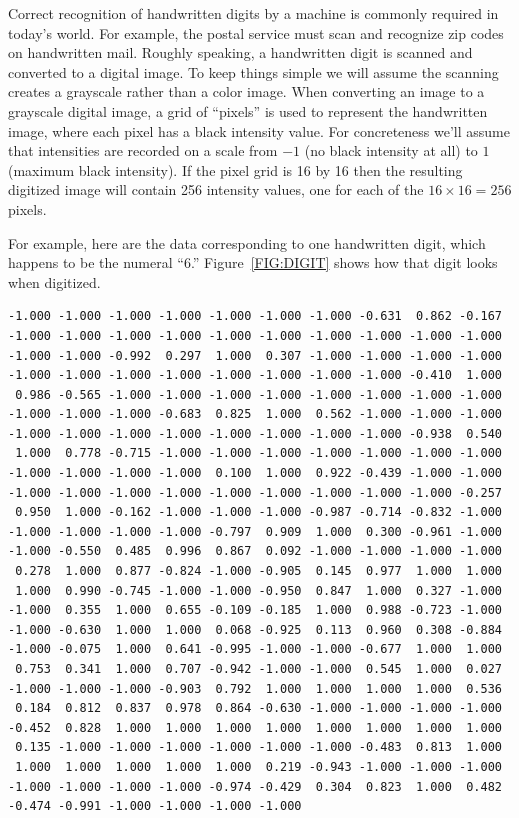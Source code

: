 \documentclass[12pt,oneside]{book}\usepackage[]{graphicx}\usepackage[]{color}
\makeatletter
\newenvironment{kframe}{%
 \def\at@end@of@kframe{}%
 \ifinner\ifhmode%
  \def\at@end@of@kframe{\end{minipage}}%
  \begin{minipage}{\columnwidth}%
 \fi\fi%
 \def\FrameCommand##1{\hskip\@totalleftmargin \hskip-\fboxsep
 \colorbox{shadecolor}{##1}\hskip-\fboxsep
     \hskip-\linewidth \hskip-\@totalleftmargin \hskip\columnwidth}%
 \MakeFramed {\advance\hsize-\width
   \@totalleftmargin\z@ \linewidth\hsize
   \@setminipage}}%
 {\par\unskip\endMakeFramed%
 \at@end@of@kframe}
\newenvironment{knitrout}{}{} %
\makeatother
\begin{document}
Correct recognition of handwritten digits by a machine is commonly required in today's world. For example, the postal service must scan and recognize zip codes on handwritten mail. Roughly speaking, a handwritten digit is scanned and converted to a digital image. To keep things simple we will assume the scanning creates a grayscale rather than a color image. When converting an image to a grayscale digital image, a grid of ``pixels'' is used to represent the handwritten image, where each pixel has a black intensity value. For concreteness we'll assume that intensities are recorded on a scale from $-1$ (no black intensity at all) to $1$ (maximum black intensity). If the pixel grid is 16 by 16 then the resulting digitized image will contain 256 intensity values, one for each of the $16\times 16 = 256$ pixels.

For example, here are the data corresponding to one handwritten digit, which happens to be the numeral ``6.'' Figure~\ref{FIG:DIGIT} shows how that digit looks when digitized.
\begin{knitrout}
\color{fgcolor}\begin{kframe}
\begin{verbatim}
-1.000 -1.000 -1.000 -1.000 -1.000 -1.000 -1.000 -0.631  0.862 -0.167 
-1.000 -1.000 -1.000 -1.000 -1.000 -1.000 -1.000 -1.000 -1.000 -1.000 
-1.000 -1.000 -0.992  0.297  1.000  0.307 -1.000 -1.000 -1.000 -1.000 
-1.000 -1.000 -1.000 -1.000 -1.000 -1.000 -1.000 -1.000 -0.410  1.000 
 0.986 -0.565 -1.000 -1.000 -1.000 -1.000 -1.000 -1.000 -1.000 -1.000 
-1.000 -1.000 -1.000 -0.683  0.825  1.000  0.562 -1.000 -1.000 -1.000 
-1.000 -1.000 -1.000 -1.000 -1.000 -1.000 -1.000 -1.000 -0.938  0.540 
 1.000  0.778 -0.715 -1.000 -1.000 -1.000 -1.000 -1.000 -1.000 -1.000 
-1.000 -1.000 -1.000 -1.000  0.100  1.000  0.922 -0.439 -1.000 -1.000 
-1.000 -1.000 -1.000 -1.000 -1.000 -1.000 -1.000 -1.000 -1.000 -0.257 
 0.950  1.000 -0.162 -1.000 -1.000 -1.000 -0.987 -0.714 -0.832 -1.000 
-1.000 -1.000 -1.000 -1.000 -0.797  0.909  1.000  0.300 -0.961 -1.000 
-1.000 -0.550  0.485  0.996  0.867  0.092 -1.000 -1.000 -1.000 -1.000 
 0.278  1.000  0.877 -0.824 -1.000 -0.905  0.145  0.977  1.000  1.000 
 1.000  0.990 -0.745 -1.000 -1.000 -0.950  0.847  1.000  0.327 -1.000 
-1.000  0.355  1.000  0.655 -0.109 -0.185  1.000  0.988 -0.723 -1.000 
-1.000 -0.630  1.000  1.000  0.068 -0.925  0.113  0.960  0.308 -0.884 
-1.000 -0.075  1.000  0.641 -0.995 -1.000 -1.000 -0.677  1.000  1.000 
 0.753  0.341  1.000  0.707 -0.942 -1.000 -1.000  0.545  1.000  0.027 
-1.000 -1.000 -1.000 -0.903  0.792  1.000  1.000  1.000  1.000  0.536 
 0.184  0.812  0.837  0.978  0.864 -0.630 -1.000 -1.000 -1.000 -1.000 
-0.452  0.828  1.000  1.000  1.000  1.000  1.000  1.000  1.000  1.000 
 0.135 -1.000 -1.000 -1.000 -1.000 -1.000 -1.000 -0.483  0.813  1.000 
 1.000  1.000  1.000  1.000  1.000  0.219 -0.943 -1.000 -1.000 -1.000 
-1.000 -1.000 -1.000 -1.000 -0.974 -0.429  0.304  0.823  1.000  0.482 
-0.474 -0.991 -1.000 -1.000 -1.000 -1.000 
\end{verbatim}
\end{kframe}
\end{knitrout}
\end{document}
